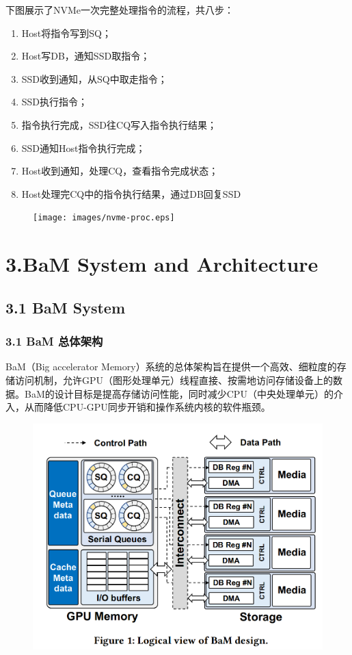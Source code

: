 \documentclass[10pt]{ctexbeamer}
\begin{document}
\begin{frame}
  下图展示了NVMe一次完整处理指令的流程，共八步：
  \begin{enumerate}
    \item Host将指令写到SQ；
    \item Host写DB，通知SSD取指令；
    \item SSD收到通知，从SQ中取走指令；
    \item SSD执行指令；
    \item 指令执行完成，SSD往CQ写入指令执行结果；
    \item SSD通知Host指令执行完成；
    \item Host收到通知，处理CQ，查看指令完成状态；
    \item Host处理完CQ中的指令执行结果，通过DB回复SSD
  \end{enumerate}
  \begin{figure}
    \texttt{[image: images/nvme-proc.eps]}
  \end{figure}
  
\end{frame}

\section[3.Architecture]{3.BaM System and Architecture}\label{sec:3}
\subsection{3.1 BaM System}\label{sec:3-1}
\begin{frame}
  \frametitle{3.1 BaM 总体架构}
  BaM（Big accelerator Memory）系统的总体架构旨在提供一个高效、细粒度的存储访问机制，允许GPU（图形处理单元）线程直接、按需地访问存储设备上的数据。BaM的设计目标是提高存储访问性能，同时减少CPU（中央处理单元）的介入，从而降低CPU-GPU同步开销和操作系统内核的软件瓶颈。
  \begin{figure}
    \includegraphics[width=.5\textwidth, height=.5\textheight, keepaspectratio]{images/bam.png}
  \end{figure}
\end{frame}
\end{document}
